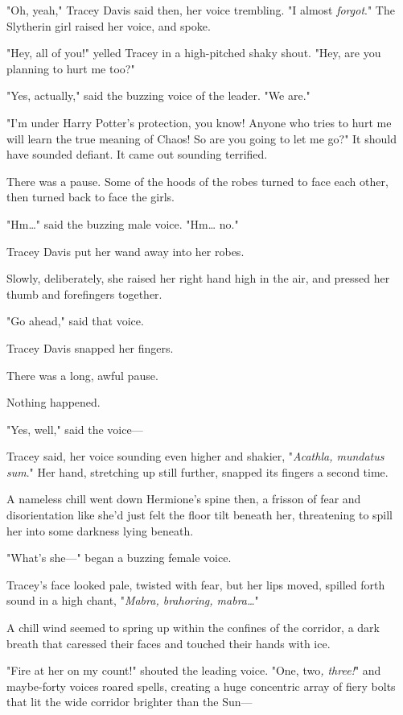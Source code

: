 "Oh, yeah," Tracey Davis said then, her voice trembling. "I almost
\emph{forgot}." The Slytherin girl raised her voice, and spoke.

"Hey, all of you!" yelled Tracey in a high-pitched shaky shout. "Hey, are you
planning to hurt me too?"

"Yes, actually," said the buzzing voice of the leader. "We are."

"I'm under Harry Potter's protection, you know! Anyone who tries to hurt me
will learn the true meaning of Chaos! So are you going to let me go?" It should
have sounded defiant. It came out sounding terrified.

There was a pause. Some of the hoods of the robes turned to face each other,
then turned back to face the girls.

"Hm{\ldots}" said the buzzing male voice. "Hm{\ldots} no."

Tracey Davis put her wand away into her robes.

Slowly, deliberately, she raised her right hand high in the air, and pressed
her thumb and forefingers together.

"Go ahead," said that voice.

Tracey Davis snapped her fingers.

There was a long, awful pause.

Nothing happened.

"Yes, well," said the voice---

Tracey said, her voice sounding even higher and shakier, "\emph{Acathla,
mundatus sum}." Her hand, stretching up still further, snapped its fingers a
second time.

A nameless chill went down Hermione's spine then, a frisson of fear and
disorientation like she'd just felt the floor tilt beneath her, threatening to
spill her into some darkness lying beneath.

"What's she---" began a buzzing female voice.

Tracey's face looked pale, twisted with fear, but her lips moved, spilled forth
sound in a high chant, "\emph{Mabra, brahoring, mabra{\ldots}}"

A chill wind seemed to spring up within the confines of the corridor, a dark
breath that caressed their faces and touched their hands with ice.

"Fire at her on my count!" shouted the leading voice. "One, two\emph{, three!}"
and maybe-forty voices roared spells, creating a huge concentric array of fiery
bolts that lit the wide corridor brighter than the Sun---

